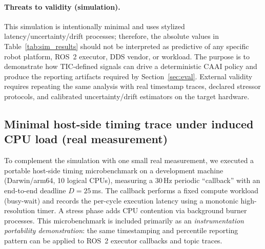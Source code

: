 \documentclass[smallextended]{svjour3}
\begin{document}
\paragraph{Threats to validity (simulation).}
This simulation is intentionally minimal and uses stylized latency/uncertainty/drift
processes; therefore, the absolute values in Table~\ref{tab:sim_results} should not be
interpreted as predictive of any specific robot platform, ROS~2 executor, DDS vendor, or
workload. The purpose is to demonstrate how TIC-defined signals can drive a deterministic
CAAI policy and produce the reporting artifacts required by Section~\ref{sec:eval}.
External validity requires repeating the same analysis with real timestamp traces, declared
stressor protocols, and calibrated uncertainty/drift estimators on the target hardware.

\subsection{Minimal host-side timing trace under induced CPU load (real measurement)}
\label{subsec:host_measurement}
To complement the simulation with one small real measurement, we executed a portable
host-side timing microbenchmark on a development machine (Darwin/arm64, 10 logical CPUs),
measuring a 30\,Hz periodic ``callback'' with an end-to-end deadline \(D=25\)\,ms.
The callback performs a fixed compute workload (busy-wait) and records the per-cycle
execution latency using a monotonic high-resolution timer. A stress phase adds CPU
contention via background burner processes. This microbenchmark is included primarily as
an \emph{instrumentation portability demonstration}: the same timestamping and percentile
reporting pattern can be applied to ROS~2 executor callbacks and topic traces.
\end{document}
